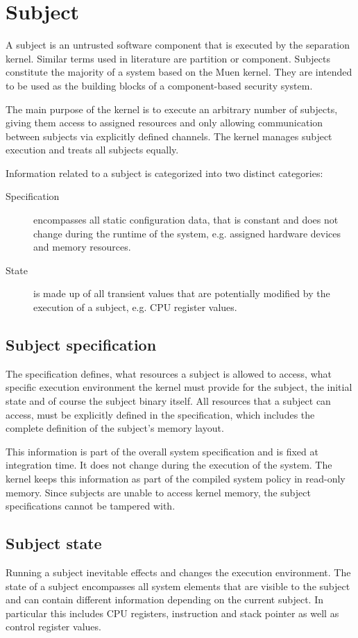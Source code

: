 \section{Subject}\label{sec:design-subject}
A subject is an untrusted software component that is executed by the separation
kernel. Similar terms used in literature are partition or component. Subjects
constitute the majority of a system based on the Muen kernel. They are intended
to be used as the building blocks of a component-based security system.

The main purpose of the kernel is to execute an arbitrary number of subjects,
giving them access to assigned resources and only allowing communication between
subjects via explicitly defined channels. The kernel manages subject execution
and treats all subjects equally.

Information related to a subject is categorized into two distinct categories:

\begin{description}
	\item[Specification] encompasses all static configuration data, that is
		constant and does not change during the runtime of the system, e.g.
		assigned hardware devices and memory resources.
	\item[State] is made up of all transient values that are potentially
		modified by the execution of a subject, e.g. CPU register values.
\end{description}

\subsection{Subject specification}
The specification defines, what resources a subject is allowed to access, what
specific execution environment the kernel must provide for the subject, the
initial state and of course the subject binary itself. All resources that a
subject can access, must be explicitly defined in the specification, which
includes the complete definition of the subject's memory layout.

This information is part of the overall system specification and is fixed at
integration time. It does not change during the execution of the system. The
kernel keeps this information as part of the compiled system policy in read-only
memory. Since subjects are unable to access kernel memory, the subject
specifications cannot be tampered with.

\subsection{Subject state}
Running a subject inevitable effects and changes the execution environment. The
state of a subject encompasses all system elements that are visible to the
subject and can contain different information depending on the current subject.
In particular this includes CPU registers, instruction and stack pointer as well
as control register values.

